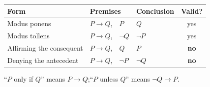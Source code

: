 \begin{center}
\renewcommand{\arraystretch}{1.35}
\begin{tabular}{l l l c}
\toprule
\textbf{Form} & \textbf{Premises} & \textbf{Conclusion} & \textbf{Valid?} \\
\midrule
Modus ponens & $P \rightarrow Q$,\ \ $P$ & $Q$ & yes \\
Modus tollens & $P \rightarrow Q$,\ \ $\neg Q$ & $\neg P$ & yes \\
Affirming the consequent & $P \rightarrow Q$,\ \ $Q$ & $P$ & \textbf{no} \\
Denying the antecedent & $P \rightarrow Q$,\ \ $\neg P$ & $\neg Q$ & \textbf{no} \\
\bottomrule
\end{tabular}

\smallskip
{\small ``$P$ only if $Q$'' means $P \rightarrow Q$;\quad ``$P$ unless $Q$'' means $\neg Q \rightarrow P$.}
\end{center}
